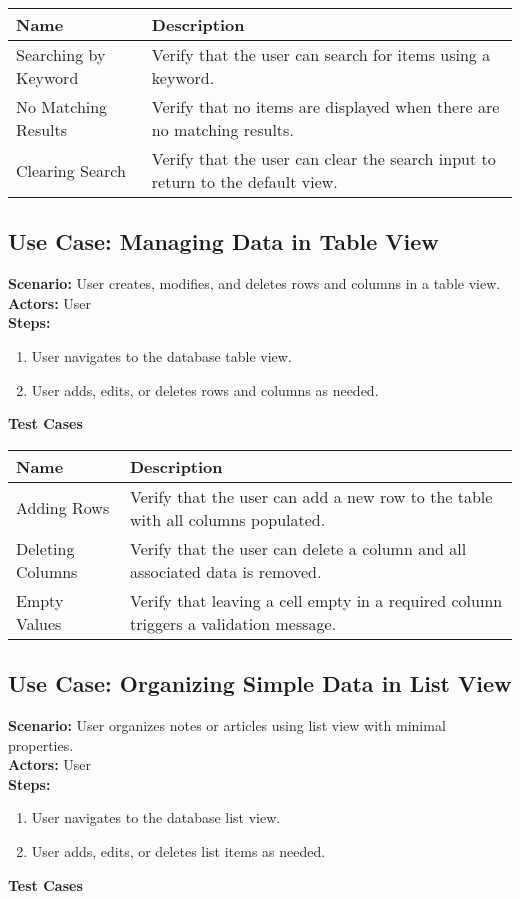 \documentclass{article}
\begin{document}
            \begin{longtable}{|p{}|p{}|}
            \hline
            \textbf{Name} & \textbf{Description} \\
            \hline
            Searching by Keyword & Verify that the user can search for items using a keyword. \\
\hline
No Matching Results & Verify that no items are displayed when there are no matching results. \\
\hline
Clearing Search & Verify that the user can clear the search input to return to the default view. \\
\hline
\end{longtable}\subsection{\textbf{Use Case: Managing Data in Table View}}
\textbf{Scenario:} User creates, modifies, and deletes rows and columns in a table view.\\
\textbf{Actors:} User\\
\textbf{Steps:}
\begin{enumerate}
\item User navigates to the database table view.
\item User adds, edits, or deletes rows and columns as needed.
\end{enumerate}
\textbf{Test Cases}

            \begin{longtable}{|p{}|p{}|}
            \hline
            \textbf{Name} & \textbf{Description} \\
            \hline
            Adding Rows & Verify that the user can add a new row to the table with all columns populated. \\
\hline
Deleting Columns & Verify that the user can delete a column and all associated data is removed. \\
\hline
Empty Values & Verify that leaving a cell empty in a required column triggers a validation message. \\
\hline
\end{longtable}\subsection{\textbf{Use Case: Organizing Simple Data in List View}}
\textbf{Scenario:} User organizes notes or articles using list view with minimal properties.\\
\textbf{Actors:} User\\
\textbf{Steps:}
\begin{enumerate}
\item User navigates to the database list view.
\item User adds, edits, or deletes list items as needed.
\end{enumerate}
\textbf{Test Cases}
\end{document}
